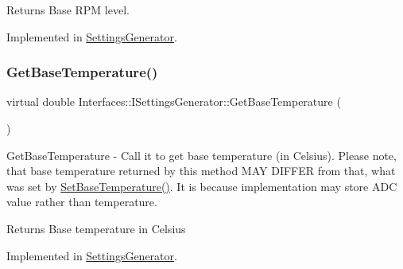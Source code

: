 \begin{DoxyReturn}{Returns}
Base R\+PM level. 
\end{DoxyReturn}


Implemented in \hyperlink{class_settings_generator_a99bbe6e67e638ccc7bf6b21b3bc36135}{Settings\+Generator}.

\mbox{\label{class_interfaces_1_1_i_settings_generator_a9cc36185b446f21e09a0e5633f39a1c5}} 
\subsubsection{\texorpdfstring{Get\+Base\+Temperature()}{GetBaseTemperature()}}
{\footnotesize\ttfamily virtual double Interfaces\+::\+I\+Settings\+Generator\+::\+Get\+Base\+Temperature (\begin{DoxyParamCaption}{ }\end{DoxyParamCaption})\hspace{0.3cm}{\ttfamily [pure virtual]}}



Get\+Base\+Temperature -\/ Call it to get base temperature (in Celsius). Please note, that base temperature returned by this method M\+AY D\+I\+F\+F\+ER from that, what was set by \hyperlink{class_interfaces_1_1_i_settings_generator_a8b60ba05790994db0303b251f655e95d}{Set\+Base\+Temperature()}. It is because implementation may store A\+DC value rather than temperature. 

\begin{DoxyReturn}{Returns}
Base temperature in Celsius 
\end{DoxyReturn}


Implemented in \hyperlink{class_settings_generator_a80b1ff8060a16d149989d98a88ab253e}{Settings\+Generator}.

\mbox{\label{class_interfaces_1_1_i_settings_generator_a1000ff41c6eecdb55a46c859ca0ebe67}} 
